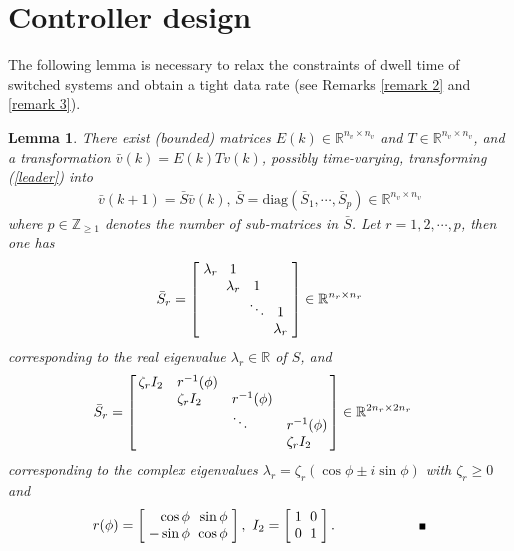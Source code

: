 \documentclass{autart}
\def\qedp{\hspace*{\fill}~{\tiny $\blacksquare$}}
\def\qedp{\hspace*{\fill}~{\tiny $\blacksquare$}}
\newtheorem{itlemma}{Lemma}
\newenvironment{lemma}{\begin{itlemma}\rm}{\end{itlemma}}
\begin{document}
\section{Controller design}
The following lemma is necessary to relax the constraints of dwell time of switched systems and obtain a tight data rate  (see Remarks \ref{remark 2} and \ref{remark 3}). 

\begin{lemma}\label{lemma 1}
	\cite{1310461} There exist (bounded) matrices $E(k)\in \mathbb R^{n_v\times n_v}$ and $T\in \mathbb R^{n_v\times n_v}$, and a transformation $\bar v(k) = E(k) T v(k)$, possibly time-varying, transforming (\ref{leader}) into 
	\begin{align} 
\!\!\!	\bar v (k+1) = \bar S  \bar v(k), \, \bar S = \text{diag}\left( \bar S_1,   \cdots,  \bar S_p \right) \in \mathbb{R} ^ {n_v \times n_v}
	\end{align}
	 	where $p\in \mathbb{Z}_{\ge 1}$ denotes the number of sub-matrices in $\bar S$.
	Let $r=1, 2, \cdots, p$, then one has
	\begin{align}\setlength{\arraycolsep}{3pt} \label{second Jordan block}
	\bar S_r = \left[\begin{array}{cccc}
	\lambda_r  &1& & \\ & \lambda_r  & 1 & \\ & & \ddots &1 \\ & & & \lambda_r
	\end{array}\right] \in  \mathbb{R}^{n_r \times n_r}
	\end{align}
	corresponding to the real eigenvalue $\lambda_r \in \mathbb R$ of $S$, and 
	\begin{align}\label{second Jordan block complex}
	&\bar S_r  = \left[
	\!\!\begin{array}{llll}\setlength{\arraycolsep}{5pt} 
	\zeta_r I_2 &r^{-1}(\phi)& & \\ & \zeta_r I_2 & r^{-1}(\phi) & \\ & & \ddots &r^{-1}(\phi) \\ & & & \zeta_r I_2
	\end{array}
	\!\!\right]  \in  \mathbb{R}^{2n_r \times 2n_r}
	\end{align}
	corresponding to the complex eigenvalues $\lambda_r=\zeta_r(\cos \phi \pm i\sin \phi  )$ with $\zeta_r \ge 0$ and
	\begin{align}\setlength{\arraycolsep}{3pt}
	r(\phi)= \left[
	\begin{array}{rr}
	\cos \phi & \sin \phi \\
	-\sin \phi & \cos \phi
	\end{array}\right],\,\,
	I_2= \left[
	\begin{array}{cc}
	1 & 0 \\
	0  & 1  
	\end{array}\right]. \nonumber \quad  \quad \quad  \quad\quad  \,\,\,\, \text{\qedp}
	\end{align}
\end{lemma}
\end{document}

